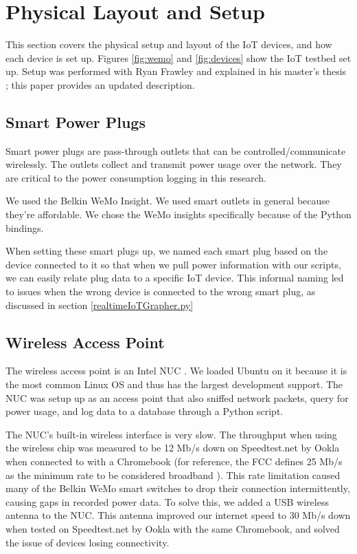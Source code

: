 \section{Physical Layout and Setup}
\label{Physical Layout and Setup}

This section covers the physical setup and layout of the IoT devices, and how each device is set up. Figures \ref{fig:wemo} and \ref{fig:devices} show the IoT testbed set up. Setup was performed with Ryan Frawley and explained in his master's thesis \cite{frawley_2018}; this paper provides an updated description.

\subsection{Smart Power Plugs}
Smart power plugs are pass-through outlets that can be controlled/communicate wirelessly. The outlets collect and transmit power usage over the network. They are critical to the power consumption logging in this research.

We used the Belkin WeMo Insight. We used smart outlets in general because they're affordable. We chose the WeMo insights specifically because of the Python bindings.

When setting these smart plugs up, we named each smart plug based on the device connected to it so that when we pull power information with our scripts, we can easily relate plug data to a specific IoT device. This informal naming led to issues when the wrong device is connected to the wrong smart plug, as discussed in section \ref{realtimeIoTGrapher.py}

\subsection{Wireless Access Point}
\label{Wireless Access Point}
The wireless access point is an Intel NUC \cite{nuc}. We loaded Ubuntu\cite{ubuntu} on it because it is the most common Linux OS \cite{linux} and thus has the largest development support. The NUC was setup up as an access point that also sniffed network packets, query for power usage, and log data to a database through a Python script.

The NUC's built-in wireless interface is very slow. The throughput when using the wireless chip was measured to be 12 Mb/s down on Speedtest.net by Ookla \cite{speedtest} when connected to with a Chromebook \cite{chromebook} (for reference, the FCC defines 25 Mb/s as the minimum rate to be considered broadband \cite{fcc_2018}). This rate limitation caused many of the Belkin WeMo smart switches \cite{wemo} to drop their connection intermittently, causing gaps in recorded power data. To solve this, we added a USB wireless antenna to the NUC. This antenna improved our internet speed to 30 Mb/s down when tested on Speedtest.net by Ookla with the same Chromebook, and solved the issue of devices losing connectivity.

